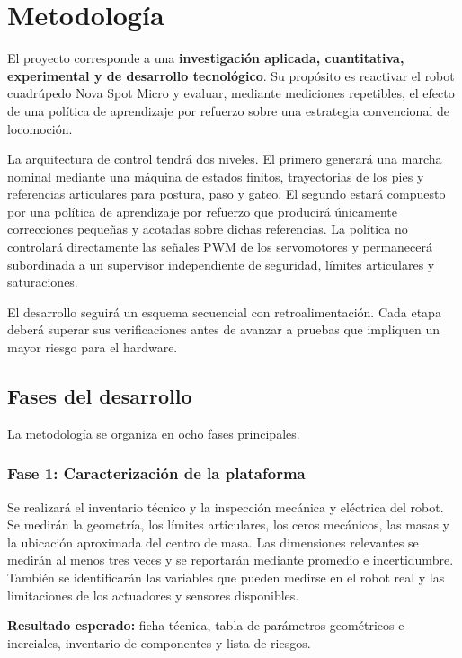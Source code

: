 \chapter{Metodología}

El proyecto corresponde a una \textbf{investigación aplicada, cuantitativa,
experimental y de desarrollo tecnológico}. Su propósito es reactivar el robot
cuadrúpedo Nova Spot Micro y evaluar, mediante mediciones repetibles, el efecto
de una política de aprendizaje por refuerzo sobre una estrategia convencional
de locomoción.

La arquitectura de control tendrá dos niveles. El primero generará una marcha
nominal mediante una máquina de estados finitos, trayectorias de los pies y
referencias articulares para postura, paso y gateo. El segundo estará compuesto
por una política de aprendizaje por refuerzo que producirá únicamente
correcciones pequeñas y acotadas sobre dichas referencias. La política no
controlará directamente las señales PWM de los servomotores y permanecerá
subordinada a un supervisor independiente de seguridad, límites articulares y
saturaciones.

El desarrollo seguirá un esquema secuencial con retroalimentación. Cada etapa
deberá superar sus verificaciones antes de avanzar a pruebas que impliquen un
mayor riesgo para el hardware.

\section{Fases del desarrollo}

La metodología se organiza en ocho fases principales.

\subsection{Fase 1: Caracterización de la plataforma}

Se realizará el inventario técnico y la inspección mecánica y eléctrica del
robot. Se medirán la geometría, los límites articulares, los ceros mecánicos,
las masas y la ubicación aproximada del centro de masa. Las dimensiones
relevantes se medirán al menos tres veces y se reportarán mediante promedio e
incertidumbre. También se identificarán las variables que pueden medirse en el
robot real y las limitaciones de los actuadores y sensores disponibles.

\textbf{Resultado esperado:} ficha técnica, tabla de parámetros geométricos e
inerciales, inventario de componentes y lista de riesgos.

